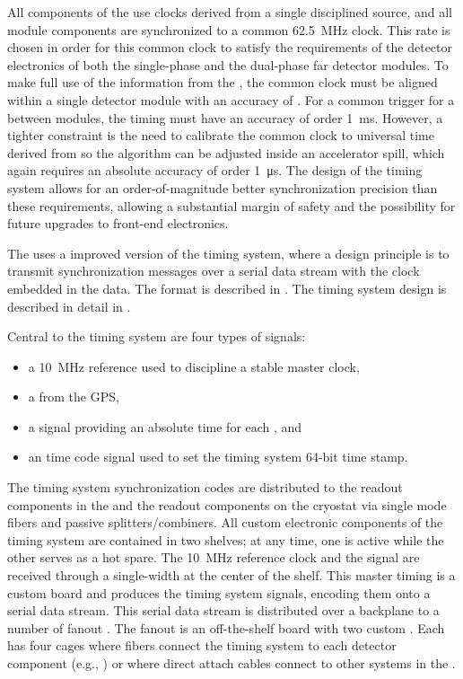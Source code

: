 All components of the  use clocks derived from a single
 disciplined source, and all module components are
synchronized to a common \SI{62.5}{MHz} clock.
%
This rate is chosen in order for this common clock to satisfy the requirements of the detector electronics of both the single-phase and the dual-phase far detector modules.
%
To make full use of the information from the , the common clock must be aligned within a single detector %
module with an accuracy of . 
For a common trigger for a  between modules, the timing must have an accuracy of order \SI{1}{\milli\second}.
However, a tighter constraint is the need to calibrate the common clock to universal time derived from  so the  algorithm can be adjusted inside an accelerator spill, which again requires an absolute accuracy of order \SI{1}{\micro\second}. The design of the timing system allows for an order-of-magnitude better synchronization precision than these requirements, allowing a substantial margin of safety and the possibility for future upgrades to front-end electronics.

The   uses a improved version of the  timing
system, where a design principle is to transmit synchronization messages over
a serial data stream with the clock embedded in the data. The format
is described in . The timing system design is
described in detail in .

Central to the timing system are four types of signals:
\begin{itemize}
\item a \SI{10}{\mega\hertz} reference used to discipline a stable master clock,
\item a  from the GPS,
\item a  signal providing an absolute time for each , and
\item an  time code signal
  used to set the timing system 64-bit time stamp.
\end{itemize}

The timing system synchronization codes are distributed to the  readout components in the  and the readout components on the cryostat via single mode fibers and passive splitters/combiners.
All custom electronic components of the timing system are contained in two  shelves; at any time, one is active while the other serves as a hot spare.
The \SI{10}{MHz} reference clock and the  signal are received through a single-width  at the center of the  shelf.
This master timing  is a custom board and produces the timing system signals, encoding them onto a serial data stream.
This serial data stream is distributed over a backplane to a number of fanout .
The fanout  is an off-the-shelf board with two custom .
Each  has four  cages where fibers connect the timing system to each detector component (e.g., ) or where direct attach cables connect to other systems in the .

